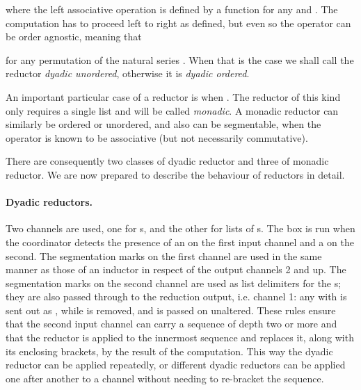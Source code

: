 \documentclass[11pt]{report}
\begin{document}
where the left associative operation  is  defined by a function  for any  and .
The computation has to proceed left to right as defined, but even so the operator  can be order agnostic, meaning that


for any permutation  of the natural series . When that is the case we shall call the reductor  {\em dyadic unordered}, otherwise it is {\em dyadic ordered}.

An important particular case of a reductor is when . The reductor of this kind only requires a single list and will be called {\em monadic}.
A monadic reductor can similarly be ordered or unordered, and also can be segmentable, when the operator  is known to be associative
(but not necessarily commutative).

There are consequently two classes of dyadic reductor and three of monadic reductor. We are now prepared to describe the behaviour of reductors in detail.

\paragraph{Dyadic reductors.} Two channels are used, one for s, and the other for lists of s. The box is run when the coordinator detects the presence of  an  on the first input channel and a  on the second. The segmentation marks on the first channel are used in the same
manner as those of an inductor in respect of the output channels 2 and up. The segmentation marks on the second channel are used as list delimiters for the s; they are also passed through to the reduction output, i.e. channel 1: any  with  is sent out as
 , while  is removed, and  is passed on unaltered. These rules ensure that the second input channel can carry a sequence of depth two or more and that the reductor is applied to the innermost sequence and replaces it, along with its enclosing brackets, by the result of the computation. This way the dyadic reductor can be applied repeatedly, or different dyadic reductors can be applied one after another to a channel without needing to re-bracket the sequence.
\end{document}
